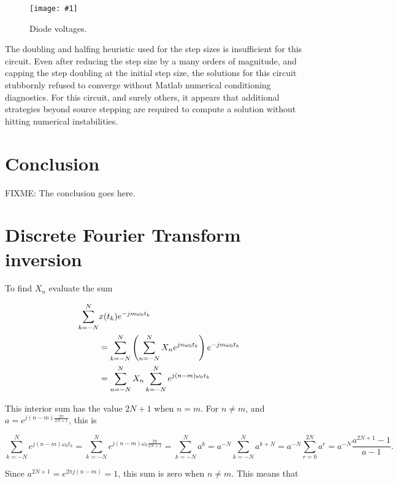 \documentclass[12pt,journal,compsoc]{../ieeepaper/IEEEtran}
\newcommand{\imageFigureHere}[4]{%
\begin{figure}[!h]%
\centering%
\texttt{[image: \#1]}%
\caption{#2}%
\label{#3}%
\end{figure}%
}
\begin{document}
\imageFigureHere{../../figures/ece1254/report/bridgeRectifierCapFilterDiodeVoltagesFig4}{Diode voltages.}{fig:bridgeRectifierCapFilterFig3}{3.0in}

The doubling and halfing heuristic used for the step sizes is insufficient for this circuit.
Even after 
reducing the step size by a many orders of magnitude, and capping the step doubling at the initial step size, the solutions for this circuit stubbornly refused to converge without Matlab numerical conditioning diagnostics.  For this circuit, and surely others, it appears that additional strategies beyond source stepping are required to compute a solution without hitting numerical instabilities.

\section{Conclusion}
FIXME: The conclusion goes here.

\section{Discrete Fourier Transform inversion}
\label{appendix:discreteFourierInversion}

To find \( X_n \) evaluate the sum

\begin{equation}\label{eqn:ece1254projectReport:80}
\begin{aligned}
\sum_{k = -N}^N &x(t_k) e^{-j m \omega_0 t_k} \\
&=
\sum_{k = -N}^N 
\lr{
\sum_{n = -N}^N X_n e^{ j n \omega_0 t_k}
}
e^{-j m \omega_0 t_k} \\
&=
\sum_{n = -N}^N X_n 
\sum_{k = -N}^N 
e^{ j (n -m )\omega_0 t_k}
\end{aligned}
\end{equation}

This interior sum has the value \( 2 N + 1 \) when \( n = m \).  For \( n \ne m \), and 
\( a = e^{j (n -m ) \frac{2 \pi}{2 N + 1}} \), this is

\begin{dmath}\label{eqn:ece1254projectReport:100}
\sum_{k = -N}^N 
e^{ j (n -m )\omega_0 t_k}
=
\sum_{k = -N}^N 
e^{ j (n -m )\omega_0 \frac{T k}{2 N + 1}}
=
\sum_{k = -N}^N a^k
=
a^{-N} \sum_{k = -N}^N a^{k+ N}
=
a^{-N} \sum_{r = 0}^{2 N} a^{r}
=
a^{-N} \frac{a^{2 N + 1} - 1}{a - 1}.
\end{dmath}

Since \( a^{2 N + 1} = e^{2 \pi j (n - m)} = 1 \), this sum is zero when \( n \ne m \).  This means that
\end{document}
